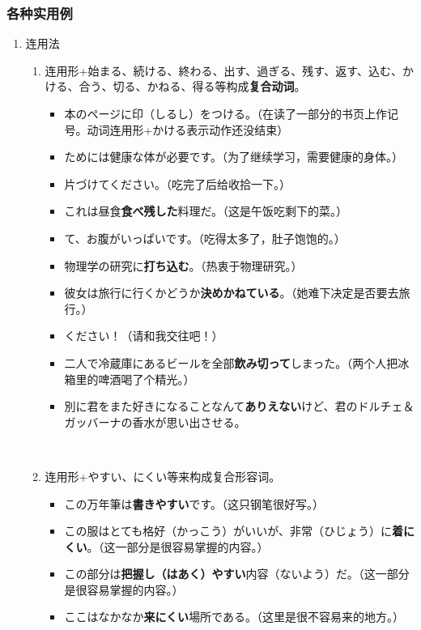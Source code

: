 \subsubsection{各种实用例}

\begin{enumerate}[A]
    \item 连用法
    \begin{enumerate}[a]
        \item 连用形+始まる、続ける、終わる、出す、過ぎる、残す、返す、込む、かける、合う、切る、かねる、得る等构成{\bfseries 复合动词}。
        \begin{itemize}
            \item {本のページに印（しるし）をつける。}（在读了一部分的书页上作记号。动词连用形+かける表示动作还没结束）
            \item {ためには健康な体が必要です。}（为了继续学习，需要健康的身体。）
            \item {片づけてください。}（吃完了后给收拾一下。）
            \item {\jp これは昼食{\bfseries 食べ残した}料理だ。}（这是午饭吃剩下的菜。）
            \item {て、お腹がいっぱいです。}（吃得太多了，肚子饱饱的。）
            \item {\jp 物理学の研究に{\bfseries 打ち込む}。}（热衷于物理研究。）
            \item {\jp 彼女は旅行に行くかどうか{\bfseries 決めかねている}。}（她难下决定是否要去旅行。）
            \item {ください！}（请和我交往吧！）
            \item {\jp 二人で冷蔵庫にあるビールを全部{\bfseries 飲み切って}しまった。}（两个人把冰箱里的啤酒喝了个精光。）
            \item {\jp 別に君をまた好きになることなんて{\bfseries ありえない}けど、君のドルチェ＆ガッバーナの香水が思い出させる。}
        \end{itemize}　
        \item 连用形+やすい、にくい等来构成复合形容词。
        \begin{itemize}
            \item {\jp この万年筆は{\bfseries 書きやすい}です。}（这只钢笔很好写。）
            \item {\jp この服はとても格好（かっこう）がいいが、非常（ひじょう）に{\bfseries 着にくい}。}（这一部分是很容易掌握的内容。）
            \item {\jp この部分は{\bfseries 把握し（はあく）やすい}内容（ないよう）だ。}（这一部分是很容易掌握的内容。）
            \item {\jp ここはなかなか{\bfseries 来にくい}場所である。}（这里是很不容易来的地方。）
        \end{itemize}


\end{enumerate}
\end{enumerate}
